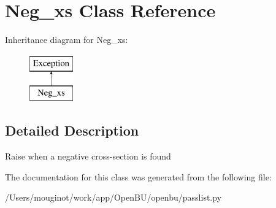 \hypertarget{classopenbu_1_1passlist_1_1_neg__xs}{}\section{Neg\+\_\+xs Class Reference}
\label{classopenbu_1_1passlist_1_1_neg__xs}
Inheritance diagram for Neg\+\_\+xs\+:\begin{figure}[H]
\begin{center}
\leavevmode
\includegraphics[height=2.000000cm]{classopenbu_1_1passlist_1_1_neg__xs}
\end{center}
\end{figure}


\subsection{Detailed Description}
\begin{DoxyVerb}Raise when a negative cross-section is found\end{DoxyVerb}
 

The documentation for this class was generated from the following file\+:\begin{DoxyCompactItemize}
\item 
/\+Users/mouginot/work/app/\+Open\+B\+U/openbu/passlist.\+py\end{DoxyCompactItemize}
